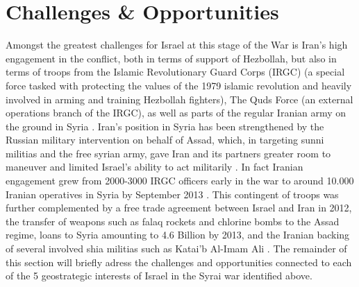 \documentclass[a4paper]{article}\twocolumn
\begin{document}
\section{Challenges \& Opportunities}%
Amongst the greatest challenges for Israel at this stage of the War is Iran's high engagement in the conflict, both in terms of support of Hezbollah, but also in terms of troops from the Islamic Revolutionary Guard Corps (IRGC) (a special force tasked with protecting the values of the 1979 islamic revolution and heavily involved in arming and training Hezbollah fighters), The Quds Force (an external operations branch of the IRGC), as well as parts of the regular Iranian army on the ground in Syria \cite{Tabrizi2016}. Iran’s position in Syria has been strengthened by the Russian military intervention on behalf of Assad, which, in targeting sunni militias and the free syrian army, gave Iran and its partners greater room to maneuver and limited Israel’s ability to act militarily \cite{Hanauer2015,ravid_2017,aronson_2017}. In fact Iranian engagement grew from 2000-3000 IRGC officers early in the war to around 10.000 Iranian operatives in Syria by September 2013 \cite{Tabrizi2016}. This contingent of troops was further complemented by a free trade agreement between Israel and Iran in 2012, the transfer of weapons such as falaq rockets and chlorine bombs to the Assad regime, loans to Syria amounting to 4.6 Billion by 2013, and the Iranian backing of several involved shia militias such as Katai’b Al-Imam
Ali \cite{Tabrizi2016}. The remainder of this section will briefly adress the challenges and opportunities connected to each of the 5 geostrategic interests of Israel in the Syrai war identified above. 
\end{document}
